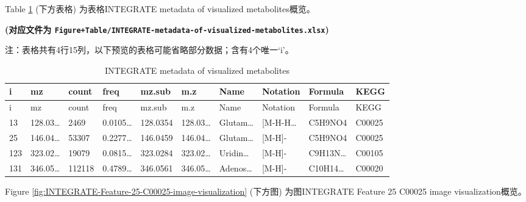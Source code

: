 \documentclass[
]{article}
\begin{document}
\begin{center}\vspace{1.5cm}\end{center}

Table \ref{tab:INTEGRATE-metadata-of-visualized-metabolites} (下方表格) 为表格INTEGRATE metadata of visualized metabolites概览。

\textbf{(对应文件为 \texttt{Figure+Table/INTEGRATE-metadata-of-visualized-metabolites.xlsx})}

\begin{center}\begin{tcolorbox}[colback=gray!10, colframe=gray!50, width=0.9\linewidth, arc=1mm, boxrule=0.5pt]注：表格共有4行15列，以下预览的表格可能省略部分数据；含有4个唯一`i'。
\end{tcolorbox}
\end{center}

\begin{longtable}[]{@{}llllllllll@{}}
\caption{\label{tab:INTEGRATE-metadata-of-visualized-metabolites}INTEGRATE metadata of visualized metabolites}\tabularnewline
\toprule
i & mz & count & freq & mz.sub & m.z & Name & Notation & Formula & KEGG\tabularnewline
\midrule
\endfirsthead
\toprule
i & mz & count & freq & mz.sub & m.z & Name & Notation & Formula & KEGG\tabularnewline
\midrule
\endhead
13 & 128.03\ldots{} & 2469 & 0.0105\ldots{} & 128.0354 & 128.03\ldots{} & Glutam\ldots{} & {[}M-H-H\ldots{} & C5H9NO4 & C00025\tabularnewline
25 & 146.04\ldots{} & 53307 & 0.2277\ldots{} & 146.0459 & 146.04\ldots{} & Glutam\ldots{} & {[}M-H{]}- & C5H9NO4 & C00025\tabularnewline
123 & 323.02\ldots{} & 19079 & 0.0815\ldots{} & 323.0284 & 323.02\ldots{} & Uridin\ldots{} & {[}M-H{]}- & C9H13N\ldots{} & C00105\tabularnewline
131 & 346.05\ldots{} & 112118 & 0.4789\ldots{} & 346.0561 & 346.05\ldots{} & Adenos\ldots{} & {[}M-H{]}- & C10H14\ldots{} & C00020\tabularnewline
\bottomrule
\end{longtable}

\begin{center}\vspace{1.5cm}\end{center}

\begin{center}\vspace{1.5cm}\end{center}

Figure \ref{fig:INTEGRATE-Feature-25-C00025-image-visualization} (下方图) 为图INTEGRATE Feature 25 C00025 image visualization概览。
\end{document}
